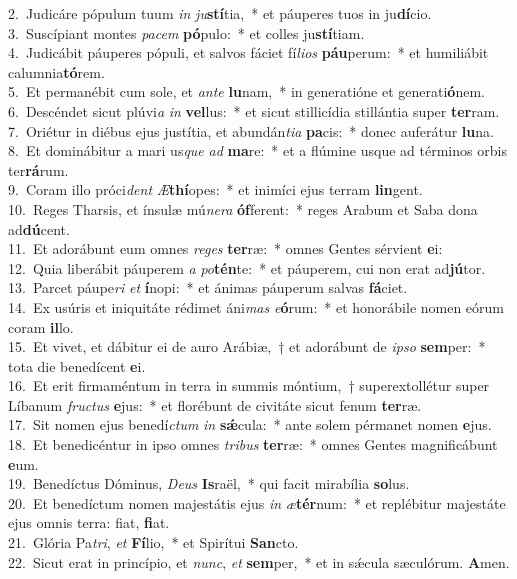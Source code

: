 {2.~}Judicáre pópulum tuum \textit{in} \textit{ju}\textbf{stí}tia,~* et páuperes tuos in ju\textbf{dí}cio.\\
{3.~}Suscípiant montes \textit{pa}\textit{cem} \textbf{pó}pulo:~* et colles ju\textbf{stí}tiam.\\
{4.~}Judicábit páuperes pópuli, et salvos fáciet fí\textit{li}\textit{os} \textbf{páu}perum:~* et humiliábit calumnia\textbf{tó}rem.\\
{5.~}Et permanébit cum sole, et \textit{an}\textit{te} \textbf{lu}nam,~* in generatióne et generati\textbf{ó}nem.\\
{6.~}Descéndet sicut plúvi\textit{a} \textit{in} \textbf{vel}lus:~* et sicut stillicídia stillántia super \textbf{ter}ram.\\
{7.~}Oriétur in diébus ejus justítia, et abundán\textit{ti}\textit{a} \textbf{pa}cis:~* donec auferátur \textbf{lu}na.\\
{8.~}Et dominábitur a mari us\textit{que} \textit{ad} \textbf{ma}re:~* et a flúmine usque ad términos orbis ter\textbf{rá}rum.\\
{9.~}Coram illo próci\textit{dent} \textit{Æ}\textbf{thí}opes:~* et inimíci ejus terram \textbf{lin}gent.\\
{10.~}Reges Tharsis, et ínsulæ mú\textit{ne}\textit{ra} \textbf{óf}ferent:~* reges Arabum et Saba dona ad\textbf{dú}cent.\\
{11.~}Et adorábunt eum omnes \textit{re}\textit{ges} \textbf{ter}ræ:~* omnes Gentes sérvient \textbf{e}i:\\
{12.~}Quia liberábit páuperem \textit{a} \textit{po}\textbf{tén}te:~* et páuperem, cui non erat ad\textbf{jú}tor.\\
{13.~}Parcet páupe\textit{ri} \textit{et} \textbf{í}nopi:~* et ánimas páuperum salvas \textbf{fá}ciet.\\
{14.~}Ex usúris et iniquitáte rédimet áni\textit{mas} \textit{e}\textbf{ó}rum:~* et honorábile nomen eórum coram \textbf{il}lo.\\
{15.~}Et vivet, et dábitur ei de auro Arábiæ,~† et adorábunt de \textit{i}\textit{pso} \textbf{sem}per:~* tota die benedícent \textbf{e}i.\\
{16.~}Et erit firmaméntum in terra in summis móntium,~† superextollétur super Líbanum \textit{fru}\textit{ctus} \textbf{e}jus:~* et florébunt de civitáte sicut fenum \textbf{ter}ræ.\\
{17.~}Sit nomen ejus benedí\textit{ctum} \textit{in} \textbf{sǽ}cula:~* ante solem pérmanet nomen \textbf{e}jus.\\
{18.~}Et benedicéntur in ipso omnes \textit{tri}\textit{bus} \textbf{ter}ræ:~* omnes Gentes magnificábunt \textbf{e}um.\\
{19.~}Benedíctus Dóminus, \textit{De}\textit{us} \textbf{Is}raël,~* qui facit mirabília \textbf{so}lus.\\
{20.~}Et benedíctum nomen majestátis ejus \textit{in} \textit{æ}\textbf{tér}num:~* et replébitur majestáte ejus omnis terra: fiat, \textbf{fi}at.\\
{21.~}Glória Pa\textit{tri}, \textit{et} \textbf{Fí}lio,~* et Spirítui \textbf{San}cto.\\
{22.~}Sicut erat in princípio, et \textit{nunc}, \textit{et} \textbf{sem}per,~* et in sǽcula sæculórum. \textbf{A}men.\\
